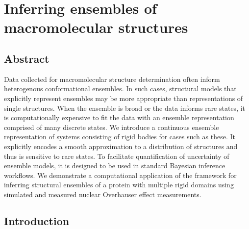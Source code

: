 \documentclass[../../main.tex]{subfiles}
\begin{document}
\chapter{Inferring ensembles of macromolecular structures} \label{ensemble-inference}

\begin{refsection}

	\section{Abstract}\label{abstract}

	Data collected for macromolecular structure determination often inform heterogenous conformational ensembles.
	In such cases, structural models that explicitly represent ensembles may be more appropriate than representations of single structures.
	When the ensemble is broad or the data informs rare states, it is computationally expensive to fit the data with an ensemble representation comprised of many discrete states.
	We introduce a continuous ensemble representation of systems consisting of rigid bodies for cases such as these.
	It explicitly encodes a smooth approximation to a distribution of structures and thus is sensitive to rare states.
	To facilitate quantification of uncertainty of ensemble models, it is designed to be used in standard Bayesian inference workflows.
	We demonstrate a computational application of the framework for inferring structural ensembles of a protein with multiple rigid domains using simulated and measured nuclear Overhauser effect measurements.

	\section{Introduction}\label{introduction}





\end{refsection}
\end{document}
